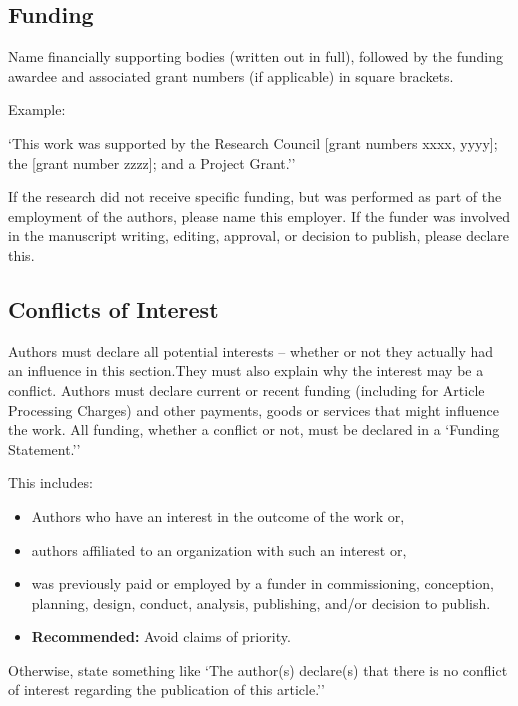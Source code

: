 \documentclass{article}
\begin{document}
	
	
	\subsection*{Funding}
	Name financially supporting bodies (written out in full), followed by the funding awardee and associated grant numbers (if applicable) in square brackets. 
	
	\medskip Example: 
	
	`This work was supported by the \underline{\hspace{5cm}} Research Council [grant numbers xxxx, yyyy]; the \underline{\hspace{5cm}} [grant number zzzz]; and a \underline{\hspace{5cm}} Project Grant.'' 
	
	\medskip
	If the research did not receive specific funding, but was performed as part of the employment of the authors, please name this employer. If the funder was involved in the manuscript writing, editing, approval, or decision to publish, please declare this.
	
	\subsection*{Conflicts of Interest} 
	
	Authors must declare all potential interests – whether or not they actually had an influence in this section.They must also explain why the interest may be a conflict. Authors must declare current or recent funding (including for Article Processing Charges) and other payments, goods or services that might influence the work. All funding, whether a conflict or not, must be declared in a `Funding Statement.'' 
	
	This includes: 
	\begin{itemize}
		\item Authors who have an interest in the outcome of the work or,
		\item authors affiliated to an organization with such an interest or,
		\item was previously paid or employed by a funder in commissioning, conception, planning, design, conduct, analysis, publishing, and/or decision to publish. 
		\item \textbf{Recommended:} Avoid claims of priority.  
	\end{itemize}
	
	Otherwise, state something like `The author(s) declare(s) that there is no conflict of interest regarding the publication of this article.''
	
\end{document}
